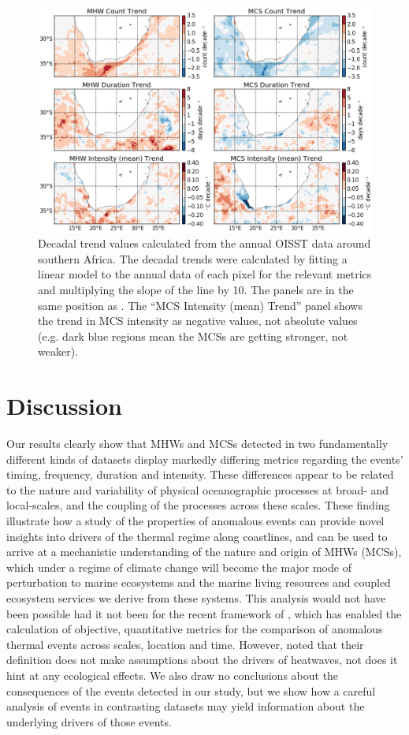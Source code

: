 \documentclass[a4paper,10pt,review]{elsarticle}
\begin{document}
\begin{figure}
\centering \includegraphics[width=1.0\textwidth]{MHW_MCS_trend.png}
\caption{Decadal trend values calculated from the annual OISST data around southern Africa. The decadal trends were calculated by fitting a linear model to the annual data of each pixel for the relevant metrics and multiplying the slope of the line by 10. The panels are in the same position as . The ``MCS Intensity (mean) Trend'' panel shows the trend in MCS intensity as negative values, not absolute values (e.g. dark blue regions mean the MCSs are getting stronger, not weaker).}
\label{fig:Figure7}
\end{figure}

\section{Discussion}
Our results clearly show that MHWs and MCSs detected in two fundamentally different kinds of datasets display markedly differing metrics regarding the events' timing, frequency, duration and intensity. These differences appear to be related to the nature and variability of physical oceanographic processes at broad- and local-scales, and the coupling of the processes across these scales. These finding illustrate how a study of the properties of anomalous events can provide novel insights into drivers of the thermal regime along coastlines, and can be used to arrive at a mechanistic understanding of the nature and origin of MHWs (MCSs), which under a regime of climate change will become the major mode of perturbation to marine ecosystems and the marine living resources and coupled ecosystem services we derive from these systems. This analysis would not have been possible had it not been for the recent framework of \citet{Hobday2016}, which has enabled the calculation of objective, quantitative metrics for the comparison of anomalous thermal events across scales, location and time. However, \citet{Hobday2016} noted that their definition does not make assumptions about the drivers of heatwaves, not does it hint at any ecological effects. We also draw no conclusions about the consequences of the events detected in our study, but we show how a careful analysis of events in contrasting datasets may yield information about the underlying drivers of those events. 
\end{document}
